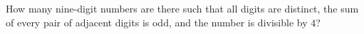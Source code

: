 How many nine-digit numbers are there such that all digits are distinct, the sum of every pair of adjacent digits is odd, and the number is divisible by $4$?
